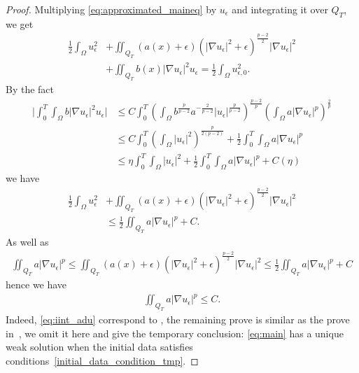 \documentclass[11pt]{amsart}
\theoremstyle{definition}
\numberwithin{equation}{section}
\newcommand*\abs[1]{\lvert#1\rvert}
\begin{document}
\begin{proof}
	Multiplying \cref{eq:approximated_maineq} by $u_\epsilon$ and integrating it over $Q_T$, we get
	\begin{equation}
		\begin{split}
			\frac{1}{2} \int_{\Omega} u_{\epsilon}^{2}
			&+\iint_{Q_{T}}(a(x)+\epsilon)\left(\left|\nabla u_{\epsilon}\right|^{2}+\epsilon\right)^{\frac{p-2}{2}}\left|\nabla u_{\epsilon}\right|^{2}\\
			&+\iint_{Q_{T}} b(x)\left|\nabla u_{\epsilon}\right|^{2} u_{\epsilon}  =\frac{1}{2} \int_{\Omega} u_{\epsilon, 0}^{2}.
		\end{split}
	\end{equation}
	By the fact
	\begin{equation}
		\begin{split}
			\abs{\int_0^T\int_{\Omega} b\abs{\nabla u_{\epsilon}}^2u_{\epsilon}}
			&\leq C\int_0^T\left( \int_{\Omega} b^{\frac{p}{p-2}}a^{-\frac{2}{p-2}}\abs{u_{\epsilon}}^{\frac{p}{p-2}} \right)^{\frac{p-2}{p}}
			\left(  \int_{\Omega} a\abs{\nabla u_{\epsilon}}^p \right)^{\frac{2}{p}}\\
			&\leq C\int_0^T\left(\int_{\Omega}\abs{u_{\epsilon}}^2\right)^{\frac{p}{2(p-2)}} + \frac{1}{2}\int_0^T\int_{\Omega} a\abs{\nabla u_{\epsilon}}^p\\
			&\leq \eta\int_0^T\int_{\Omega}\abs{u_{\epsilon}}^2 + \frac{1}{2}\int_0^T\int_{\Omega} a\abs{\nabla u_{\epsilon}}^p + C(\eta)
		\end{split}
	\end{equation}
	we have
	\begin{equation}
		\begin{split}
			\frac{1}{2} \int_{\Omega} u_{\epsilon}^{2}
			&+\iint_{Q_{T}}(a(x)+\epsilon)\left(\left|\nabla u_{\epsilon}\right|^{2}+\epsilon\right)^{\frac{p-2}{2}}\left|\nabla u_{\epsilon}\right|^{2}\\
			&\leq \frac{1}{2}\iint_{Q_T}a\abs{\nabla u_\epsilon}^p + C.
		\end{split}
	\end{equation}
	As well as
	\begin{equation}
		\begin{split}
			\iint_{Q_T}a\abs{\nabla u_\epsilon}^p
			\leq \iint_{Q_{T}}(a(x)+\epsilon)\left(\left|\nabla u_{\epsilon}\right|^{2}+\epsilon\right)^{\frac{p-2}{2}}\left|\nabla u_{\epsilon}\right|^{2}
			\leq \frac{1}{2}\iint_{Q_T}a\abs{\nabla u_\epsilon}^p + C
		\end{split}
	\end{equation}
	hence we have
	\begin{equation}\label{eq:iint_adu}
		\begin{split}
			\iint_{Q_T}a\abs{\nabla u_\epsilon}^p \leq C.
		\end{split}
	\end{equation}
	Indeed, \cref{eq:iint_adu} correspond to \cite[thm 1.3 eq. (2.5)]{Zhan2019Uniquenessa},
	the remaining prove is similar as the prove in~\cite[thm 1.3]{Zhan2019Uniquenessa}, we omit it here and give the temporary conclusion:
	\cref{eq:main} has a unique weak solution when the initial data satisfies conditions~\eqref{initial_data_condition_tmp}.


\end{proof}
\end{document}
